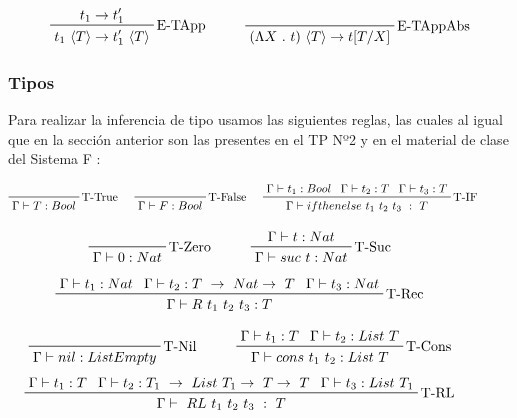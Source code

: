 \documentclass[12pt, titlepage, a4paper]{article}
\begin{document}
\begin{displaymath}
    \prftree[r]{E-TApp}{t_1 \rightarrow t_1'}{t_1 \ \langle T \rangle \rightarrow t_1' \ \langle T \rangle} \hspace{1cm}
    \prftree[r]{E-TAppAbs}{(\Lambda X \ . \ t)\ \langle T \rangle \rightarrow t[T/X]}
\end{displaymath}

\subsubsection{Tipos}
Para realizar la inferencia de tipo usamos las siguientes reglas, las cuales al igual que en la sección anterior son las
presentes en el TP Nº2 \cite{tp2:lambdaCalculoSimpleTipado} y en el material de clase del Sistema F \cite{ALP:Polimorfismo}:

\begin{displaymath}
    \prftree[r]{T-True}{\Gamma \vdash T: Bool} \hspace{0.5cm}
    \prftree[r]{T-False}{\Gamma \vdash F:  Bool} \hspace{0.5cm}  
    \prftree[r]{T-IF}{\Gamma \vdash t_1 : Bool}{\Gamma \vdash t_2 : T}{\Gamma \vdash t_3 : T}{\Gamma \vdash ifthenelse \ t_1 \ t_2 \ t_3 \ : \ T} \hspace{1cm}
\end{displaymath}

\begin{displaymath}
    \prftree[r]{T-Zero}{\Gamma \vdash 0 : Nat} \hspace{1cm}
    \prftree[r]{T-Suc}{\Gamma \vdash t : Nat}{\Gamma \vdash suc \ t : Nat} \hspace{1cm}
\end{displaymath}
\begin{displaymath}
    \prftree[r]{T-Rec}{\Gamma \vdash t_1 : Nat}{\Gamma \vdash t_2 : T \ \rightarrow \ Nat \rightarrow \ T}{\Gamma \vdash t_3 : Nat}{\Gamma \vdash R \ t_1 \ t_2 \ t_3 : T} \hspace{1cm}
\end{displaymath}

\begin{displaymath}
    \prftree[r]{T-Nil}{\Gamma \vdash nil : ListEmpty} \hspace{1cm}
    \prftree[r]{T-Cons}{\Gamma \vdash t_1 : T}{\Gamma \vdash t_2 : List \ T}{\Gamma \vdash cons \ t_1 \ t_2 :  List \ T} \hspace{1cm}
\end{displaymath}
\begin{displaymath}
    \prftree[r]{T-RL}{\Gamma \vdash t_1 : T}{\Gamma \vdash t_2 : T_1 \ \rightarrow \ List \ T_1 \rightarrow \ T \rightarrow \ T}{\Gamma \vdash t_3 : List \ T_1}{\Gamma \vdash \ RL \ t_1 \ t_2 \ t_3 \ : \ T} \hspace{1cm}
\end{displaymath}
\end{document}
